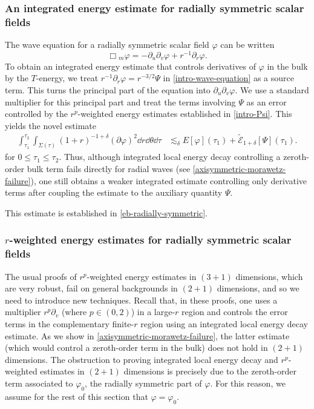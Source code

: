 \documentclass[10pt, reqno]{amsart}
\begin{document}
\subsubsection{An integrated energy estimate for radially symmetric scalar fields}
\label{intro-morawetz-radially-symmetric}
The wave equation for a radially symmetric scalar field \(\varphi\) can be written
\begin{equation}\label{intro-wave-equation}
\Box{}_m\varphi{} = -\partial{}_u\partial{}_v\varphi{} + r^{-1}\partial{}_r\varphi{}.
\end{equation}
To obtain an integrated energy estimate that controls derivatives of \(\varphi\) in
the bulk by the \(T\)-energy, we treat \(r^{-1}\partial_r\varphi =
r^{-3/2}\Psi\) in \cref{intro-wave-equation} as a source term. This turns the
principal part of the equation into \(\partial_u\partial_v\varphi{}\). We use a
standard multiplier for this principal part and treat the terms involving
\(\Psi{}\) as an error controlled by the \(r^p\)-weighted energy estimates
established in \cref{intro-Psi}. This yields the novel estimate
\begin{equation}\label{intro-morawetz-Psi}
\begin{split}
\int_{\tau{}_1}^{\tau{}_2} \int _{\Sigma{}(\tau{})} (1+r)^{-1+\delta{}}(\partial{}\varphi)^2\dd{}r\dd{}\theta{}\dd{}\tau{} &\lesssim_{\delta{}} E[\varphi{}](\tau{}_1) + \tilde{\mathcal{E}}_{1+\delta{}}[\Psi{}](\tau{}_1).
\end{split}
\end{equation}
for \(0\le \tau_1\le \tau_2\). Thus, although integrated local energy decay controlling a
zeroth-order bulk term fails directly for radial waves (see
\cref{axisymmetric-morawetz-failure}), one still obtains a weaker integrated
estimate controlling only derivative terms after coupling the estimate to the
auxiliary quantity \(\Psi{}\).

This estimate is established in \cref{eb-radially-symmetric}.
\subsubsection{\(r\)-weighted energy estimates for radially symmetric scalar fields}
\label{intro-r-radially-symmetric} The usual proofs \cite{rp-method,moschidis-rp} of
\(r^p\)-weighted energy estimates in \((3 + 1)\) dimensions, which are very
robust, fail on general backgrounds in \((2 + 1)\) dimensions, and so we need to
introduce new techniques. Recall that, in these proofs, one uses a multiplier
\(r^p\partial_v\) (where \(p\in (0,2)\)) in a large-\(r\) region and controls
the error terms in the complementary finite-\(r\) region using an integrated
local energy decay estimate. As we show in \cref{axisymmetric-morawetz-failure},
the latter estimate (which would control a zeroth-order term in the bulk) does
not hold in \((2 + 1)\) dimensions. The obstruction to proving integrated local
energy decay and \(r^p\)-weighted estimates in \((2 + 1)\) dimensions is
precisely due to the zeroth-order term associated to \(\varphi_0\), the radially
symmetric part of \(\varphi{}\). For this reason, we assume for the rest of this
section that \(\varphi{} = \varphi_0\).
\end{document}
